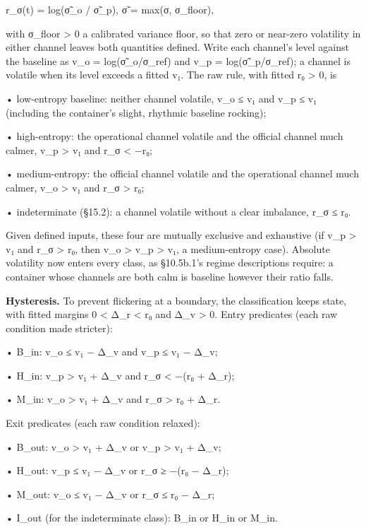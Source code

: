\documentclass[
]{article}
\begin{document}
r\_σ(t) = log(σ̃\_o / σ̃\_p), σ̃ = max(σ, σ\_floor),

with σ\_floor \textgreater{} 0 a calibrated variance floor, so that zero
or near-zero volatility in either channel leaves both quantities
defined. Write each channel's level against the baseline as v\_o =
log(σ̃\_o/σ\_ref) and v\_p = log(σ̃\_p/σ\_ref); a channel is volatile when
its level exceeds a fitted v₁. The raw rule, with fitted r₀
\textgreater{} 0, is

• low-entropy baseline: neither channel volatile, v\_o ≤ v₁ and v\_p ≤
v₁ (including the container's slight, rhythmic baseline rocking);

• high-entropy: the operational channel volatile and the official
channel much calmer, v\_p \textgreater{} v₁ and r\_σ \textless{} −r₀;

• medium-entropy: the official channel volatile and the operational
channel much calmer, v\_o \textgreater{} v₁ and r\_σ \textgreater{} r₀;

• indeterminate (§15.2): a channel volatile without a clear imbalance,
\textbar r\_σ\textbar{} ≤ r₀.

Given defined inputs, these four are mutually exclusive and exhaustive
(if v\_p \textgreater{} v₁ and r\_σ \textgreater{} r₀, then v\_o
\textgreater{} v\_p \textgreater{} v₁, a medium-entropy case). Absolute
volatility now enters every class, as §10.5b.1's regime descriptions
require: a container whose channels are both calm is baseline however
their ratio falls.

\textbf{Hysteresis.} To prevent flickering at a boundary, the
classification keeps state, with fitted margins 0 \textless{} Δ\_r
\textless{} r₀ and Δ\_v \textgreater{} 0. Entry predicates (each raw
condition made stricter):

• B\_in: v\_o ≤ v₁ − Δ\_v and v\_p ≤ v₁ − Δ\_v;

• H\_in: v\_p \textgreater{} v₁ + Δ\_v and r\_σ \textless{} −(r₀ +
Δ\_r);

• M\_in: v\_o \textgreater{} v₁ + Δ\_v and r\_σ \textgreater{} r₀ +
Δ\_r.

Exit predicates (each raw condition relaxed):

• B\_out: v\_o \textgreater{} v₁ + Δ\_v or v\_p \textgreater{} v₁ +
Δ\_v;

• H\_out: v\_p ≤ v₁ − Δ\_v or r\_σ ≥ −(r₀ − Δ\_r);

• M\_out: v\_o ≤ v₁ − Δ\_v or r\_σ ≤ r₀ − Δ\_r;

• I\_out (for the indeterminate class): B\_in or H\_in or M\_in.
\end{document}
